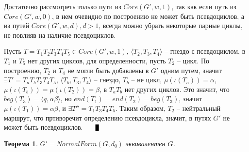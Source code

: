 \documentclass{article}
\newtheorem{theorem}{Теорема}[section]
\newenvironment{proof}[1][Доказательство]{\begin{trivlist}
\item[\hskip \labelsep {\bfseries #1}]}{\end{trivlist}}
\newcommand{\qed}{\nobreak \ifvmode \relax \else
      \ifdim\lastskip<1.5em \hskip-\lastskip
      \hskip1.5em plus0em minus0.5em \fi \nobreak
      \vrule height0.75em width0.5em depth0.25em\fi}
\begin{document}
\begin{proof}
    Достаточно рассмотреть только пути из $Core(G',w,1)$, так как если путь из $Core(G',w,0)$, в нем очевидно 
    по построению не может быть псевдоциклов, а из путей $Core(G',w,d), d > 1$, всегда можно убрать
    некоторые парные циклы, не повлияв на наличие псевдоциклов.

    Пусть $T = T_1 T_2 T_3 T_4 T_5 \in Core(G',w,1)$, $\langle T_2, T_3, T_4 \rangle$ -- гнездо с псевдоциклом,
    в $T_1$ и $T_5$ нет других циклов,
    для определенности, пусть $T_2$ -- цикл.
    По построению, $T_2$ и $T_4$ не могли быть добавлены в $G'$ одним путем, значит 
    $\exists T' = T_a T_b T_3 T_4 T_5$, $\langle T_b, T_3, T_4 \rangle$ -- гнездо, $T_b$ -- не цикл,
    $\mu(\iota(T_a)) = \alpha$,
    $\mu(\iota(T_b)) = \mu(\iota(T_2)) = \beta$,
    в $T_a T_b$ нет других циклов.
    Это значит, что $beg(T_3) = \langle q, \alpha \beta \rangle$, но $end(T_1) = end(T_2) = beg(T_3)$,
    значит $\mu(\iota(T_1)) = \alpha \beta$, и $\exists T'' = T_1 T_3 T_4 T_5$.
    Таким образом, $T_2$ -- нейтральный маршрут, что пртиворечит определению псевдоцикла, 
    значит, в путях $G'$ не может быть псевдоциклов. $\qed$ 
\end{proof}

\begin{theorem}
    $G' = NormalForm(G, d_0)$ эквивалентен $G$.
\end{theorem}
\end{document}
